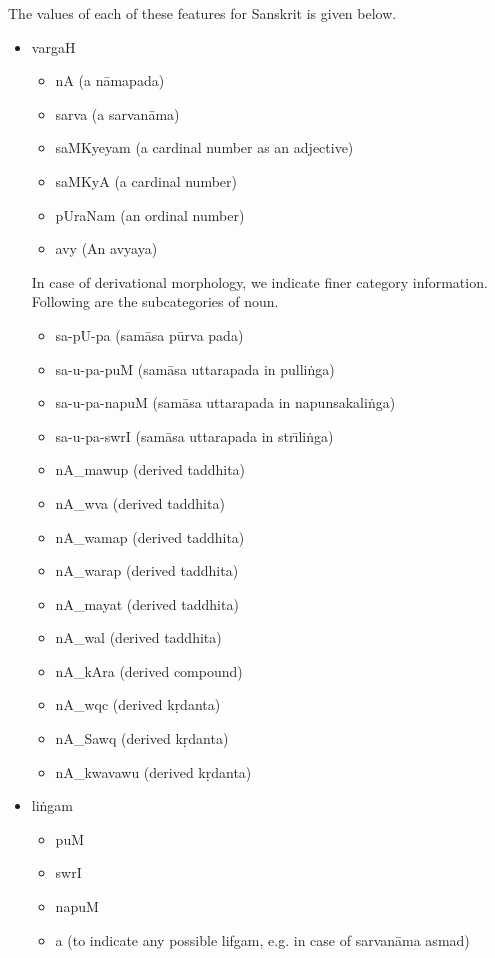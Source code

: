\documentclass{llncs}
\begin{document}
\noindent 
The values of each of these features for Sanskrit is given below.\\
\begin{itemize}
\item vargaH
\begin{itemize}
\item nA (a n{\=a}mapada)
\item sarva (a sarvan{\=a}ma)
\item saMKyeyam (a cardinal number as an adjective)
\item saMKyA (a cardinal number)
\item pUraNam (an ordinal number)
\item avy  (An avyaya)
\end{itemize}
In case of derivational morphology, we indicate finer category information. Following are the subcategories of noun.
\begin{itemize}
\item sa-pU-pa  (sam{\=a}sa p{\=u}rva pada)
\item sa-u-pa-puM (sam{\=a}sa uttarapada in pulli\.{n}ga)
\item sa-u-pa-napuM (sam{\=a}sa uttarapada in napunsakali\.{n}ga)
\item sa-u-pa-swrI (sam{\=a}sa uttarapada in str{\=\i}li\.{n}ga)
\item nA\_mawup (derived taddhita)
\item nA\_wva (derived taddhita)
\item nA\_wamap (derived taddhita)
\item nA\_warap (derived taddhita)
\item nA\_mayat (derived taddhita)
\item nA\_wal (derived taddhita)
\item nA\_kAra (derived compound)
\item nA\_wqc (derived k\d{r}danta)
\item nA\_Sawq (derived k\d{r}danta)
\item nA\_kwavawu (derived k\d{r}danta)
\end{itemize}

\item li\.{n}gam
\begin{itemize}
\item puM
\item swrI
\item napuM
\item a (to indicate any possible lifgam, e.g. in case of sarvan{\=a}ma asmad)
\end{itemize}


\end{itemize}
\end{document}
